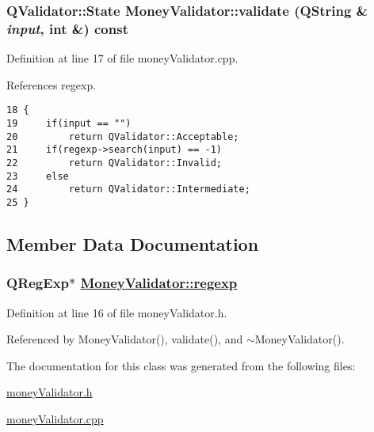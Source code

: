 \hypertarget{classMoneyValidator_a2}{
\subsubsection[validate]{\setlength{\rightskip}{0pt plus 5cm}QValidator::State Money\-Validator::validate (QString \& {\em input}, int \&) const}}
\label{classMoneyValidator_a2}


Definition at line 17 of file money\-Validator.cpp.

References regexp.

\footnotesize\begin{verbatim}18 {
19     if(input == "")
20         return QValidator::Acceptable;
21     if(regexp->search(input) == -1)
22         return QValidator::Invalid;
23     else
24         return QValidator::Intermediate;
25 }
\end{verbatim}\normalsize 




\subsection{Member Data Documentation}
\hypertarget{classMoneyValidator_r0}{
\subsubsection[regexp]{\setlength{\rightskip}{0pt plus 5cm}QReg\-Exp$\ast$ \hyperlink{classMoneyValidator_r0}{Money\-Validator::regexp}}}
\label{classMoneyValidator_r0}


Definition at line 16 of file money\-Validator.h.

Referenced by Money\-Validator(), validate(), and $\sim$Money\-Validator().

The documentation for this class was generated from the following files:\begin{CompactItemize}
\item 
\hyperlink{moneyValidator_8h}{money\-Validator.h}\item 
\hyperlink{moneyValidator_8cpp}{money\-Validator.cpp}\end{CompactItemize}
